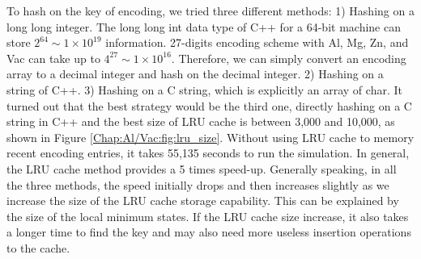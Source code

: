 To hash on the key of encoding, we tried three different methods: 1) Hashing on a long long integer. The long long int data type of C++ for a 64-bit machine can store $2^{64} \sim 1\times10^{19}$ information. 27-digits encoding scheme with Al, Mg, Zn, and Vac can take up to $4^{27} \sim 1\times10^{16}$. Therefore, we can simply convert an encoding array to a decimal integer and hash on the decimal integer. 2) Hashing on a string of C++. 3) Hashing on a C string, which is explicitly an array of char. It turned out that the best strategy would be the third one, directly hashing on a C string in C++ and the best size of \ac{LRU} cache is between 3,000 and 10,000, as shown in Figure \ref{Chap:Al/Vac:fig:lru_size}. Without using \ac{LRU} cache to memory recent encoding entries, it takes 55,135 seconds to run the simulation. In general, the \ac{LRU} cache method provides a 5 times speed-up. Generally speaking, in all the three methods, the speed initially drops and then increases slightly as we increase the size of the \ac{LRU} cache storage capability. This can be explained by the size of the local minimum states. If the \ac{LRU} cache size increase, it also takes a longer time to find the key and may also need more useless insertion operations to the cache.

